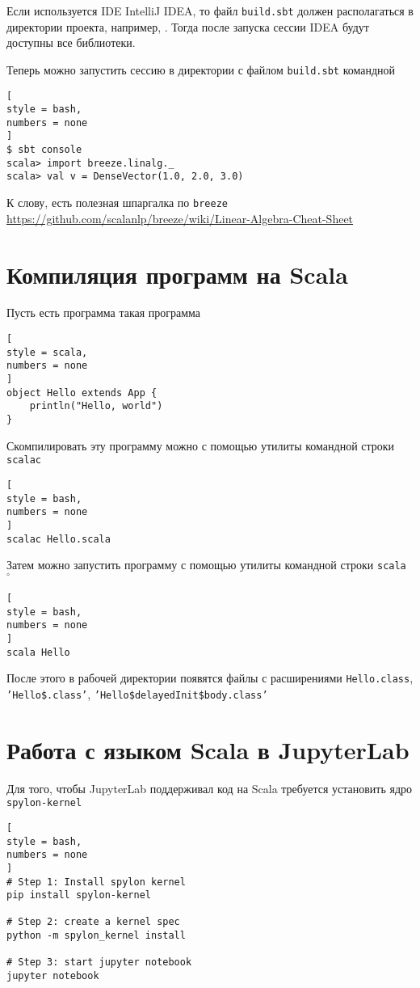 \documentclass[%
	11pt,
	a4paper,
	utf8,
		]{article}
\begin{document}
Если используется IDE IntelliJ IDEA, то файл \texttt{build.sbt} должен располагаться в директории проекта, например, . Тогда после запуска сессии IDEA будут доступны все библиотеки.

Теперь можно запустить сессию в директории с файлом \texttt{build.sbt} командной
\begin{lstlisting}[
style = bash,
numbers = none
]
$ sbt console
scala> import breeze.linalg._
scala> val v = DenseVector(1.0, 2.0, 3.0)
\end{lstlisting}

К слову, есть полезная шпаргалка по \texttt{breeze} \url{https://github.com/scalanlp/breeze/wiki/Linear-Algebra-Cheat-Sheet}

\section{Компиляция программ на Scala}

Пусть есть программа такая программа
\begin{lstlisting}[
style = scala,
numbers = none	
]
object Hello extends App {
	println("Hello, world")
}
\end{lstlisting}

Скомпилировать эту программу можно с помощью утилиты командной строки \texttt{scalac}
\begin{lstlisting}[
style = bash,
numbers = none	
]
scalac Hello.scala
\end{lstlisting}

Затем можно запустить программу с помощью утилиты командной строки \texttt{scala} $ {}^{\circ} $
\begin{lstlisting}[
style = bash,
numbers = none	
]
scala Hello
\end{lstlisting}

После этого в рабочей директории появятся файлы с расширениями \texttt{Hello.class}, \texttt{'Hello\$.class'}, \texttt{'Hello\$delayedInit\$body.class'}

\section{Работа с языком Scala в JupyterLab}

Для того, чтобы JupyterLab поддерживал код на Scala требуется установить ядро \texttt{spylon-kernel}
\begin{lstlisting}[
style = bash,
numbers = none	
]
# Step 1: Install spylon kernel
pip install spylon-kernel

# Step 2: create a kernel spec
python -m spylon_kernel install

# Step 3: start jupyter notebook 
jupyter notebook
\end{lstlisting}
\end{document}
